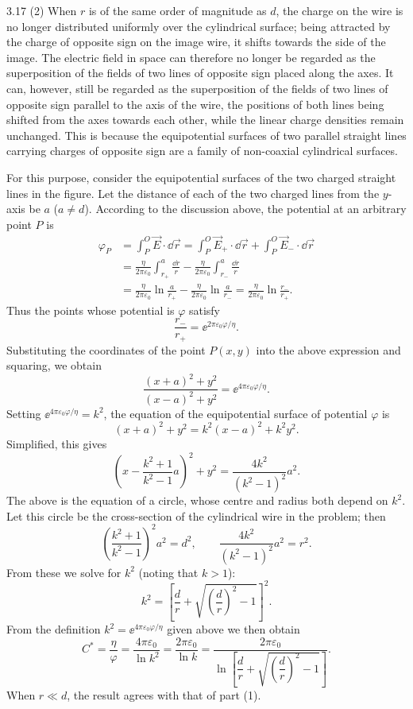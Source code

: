 \begin{solution}{3.17}
(2) When $r$ is of the same order of magnitude as $d$, the charge on the wire is no longer distributed uniformly over the cylindrical surface; being attracted by the charge of opposite sign on the image wire, it shifts towards the side of the image. The electric field in space can therefore no longer be regarded as the superposition of the fields of two lines of opposite sign placed along the axes. It can, however, still be regarded as the superposition of the fields of two lines of opposite sign parallel to the axis of the wire, the positions of both lines being shifted from the axes towards each other, while the linear charge densities remain unchanged. This is because the equipotential surfaces of two parallel straight lines carrying charges of opposite sign are a family of non-coaxial cylindrical surfaces.

For this purpose, consider the equipotential surfaces of the two charged straight lines in the figure. Let the distance of each of the two charged lines from the $y$-axis be $a$ ($a\ne d$). According to the discussion above, the potential at an arbitrary point $P$ is
\begin{align*}
\varphi_P&=\int_P^O\vec{E}\cdot\dd\vec{r}
=\int_P^O\vec{E}_+\cdot\dd\vec{r}+\int_P^O\vec{E}_-\cdot\dd\vec{r}\\
&=\frac{\eta}{2\pi\varepsilon_0}\int_{r_+}^a\frac{\dd r}{r}
-\frac{\eta}{2\pi\varepsilon_0}\int_{r_-}^a\frac{\dd r}{r}\\
&=\frac{\eta}{2\pi\varepsilon_0}\ln\frac{a}{r_+}
-\frac{\eta}{2\pi\varepsilon_0}\ln\frac{a}{r_-}
=\frac{\eta}{2\pi\varepsilon_0}\ln\frac{r_-}{r_+}.
\end{align*}
Thus the points whose potential is $\varphi$ satisfy
\[
\frac{r_-}{r_+}=\ee^{2\pi\varepsilon_0\varphi/\eta}.
\]
Substituting the coordinates of the point $P(x,y)$ into the above expression and squaring, we obtain
\[
\frac{(x+a)^2+y^2}{(x-a)^2+y^2}=\ee^{4\pi\varepsilon_0\varphi/\eta}.
\]
Setting $\ee^{4\pi\varepsilon_0\varphi/\eta}=k^2$, the equation of the equipotential surface of potential $\varphi$ is
\[
(x+a)^2+y^2=k^2(x-a)^2+k^2y^2.
\]
Simplified, this gives
\[
\left(x-\frac{k^2+1}{k^2-1}a\right)^2+y^2=\frac{4k^2}{(k^2-1)^2}a^2.
\]
The above is the equation of a circle, whose centre and radius both depend on $k^2$. Let this circle be the cross-section of the cylindrical wire in the problem; then
\[
\left(\frac{k^2+1}{k^2-1}\right)^2a^2=d^2,\qquad
\frac{4k^2}{(k^2-1)^2}a^2=r^2.
\]
From these we solve for $k^2$ (noting that $k>1$):
\[
k^2=\left[\frac{d}{r}+\sqrt{\left(\frac{d}{r}\right)^2-1}\right]^2.
\]
From the definition $k^2=\ee^{4\pi\varepsilon_0\varphi/\eta}$ given above we then obtain
\[
C^*=\frac{\eta}{\varphi}=\frac{4\pi\varepsilon_0}{\ln k^2}
=\frac{2\pi\varepsilon_0}{\ln k}
=\frac{2\pi\varepsilon_0}{\ln\left[\dfrac{d}{r}+\sqrt{\left(\dfrac{d}{r}\right)^2-1}\right]}.
\]
When $r\ll d$, the result agrees with that of part (1).
\end{solution}

